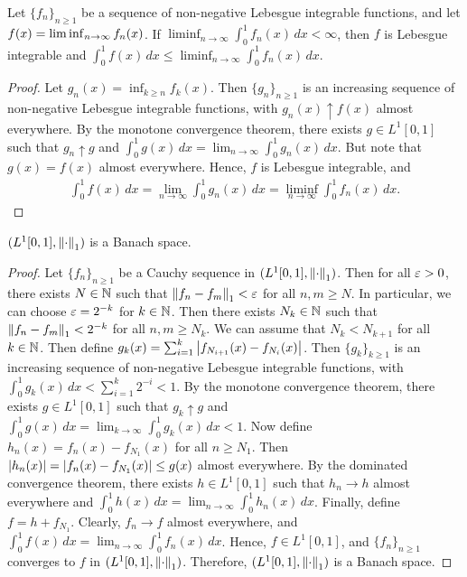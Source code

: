 \begin{lemma}
    Let $\{f_{n}\}_{n \geq 1}$ be a sequence of non-negative Lebesgue integrable functions, and let $f(x) = \liminf_{n \to \infty} f_{n}(x)$. If $\liminf_{n \to \infty} \int_{0}^{1} f_{n}(x) \, dx < \infty$, then $f$ is Lebesgue integrable and $\int_{0}^{1} f(x) \, dx \leq \liminf_{n \to \infty} \int_{0}^{1} f_{n}(x) \, dx$.
\end{lemma}
\begin{proof}
    Let $g_{n}(x) = \inf_{k \geq n} f_{k}(x)$. Then $\{g_{n}\}_{n \geq 1}$ is an increasing sequence of non-negative Lebesgue integrable functions, with $g_{n}(x) \uparrow f(x)$ almost everywhere. By the monotone convergence theorem, there exists $g \in L^{1}[0,1]$ such that $g_{n} \uparrow g$ and $\int_{0}^{1} g(x) \, dx = \lim_{n \to \infty} \int_{0}^{1} g_{n}(x) \, dx$. But note that $g(x) = f(x)$ almost everywhere. Hence, $f$ is Lebesgue integrable, and
    \begin{align}
        \int_{0}^{1} f(x) \, dx = \lim_{n \to \infty} \int_{0}^{1} g_{n}(x) \, dx = \liminf_{n \to \infty} \int_{0}^{1} f_{n}(x) \, dx.
    \end{align}
\end{proof}

\begin{theorem}
    $(L^{1}[0,1],\left\lVert\cdot\right\rVert_{1})$ is a Banach space.
\end{theorem}

\begin{proof}
    Let $\{f_{n}\}_{n \geq 1}$ be a Cauchy sequence in $(L^{1}[0,1],\left\lVert\cdot\right\rVert_{1})$. Then for all $\varepsilon > 0$, there exists $N \in \mathbb{N}$ such that $\left\lVert f_{n}-f_{m}\right\rVert_{1} < \varepsilon$ for all $n,m \geq N$. In particular, we can choose $\varepsilon = 2^{-k}$ for $k \in \mathbb{N}$. Then there exists $N_{k} \in \mathbb{N}$ such that $\left\lVert f_{n}-f_{m}\right\rVert_{1} < 2^{-k}$ for all $n,m \geq N_{k}$. We can assume that $N_{k} < N_{k+1}$ for all $k \in \mathbb{N}$. Then define $g_{k}(x) = \sum_{i=1}^{k} \left| f_{N_{i+1}}(x)-f_{N_{i}}(x) \right|$. Then $\{g_{k}\}_{k \geq 1}$ is an increasing sequence of non-negative Lebesgue integrable functions, with $\int_{0}^{1} g_{k}(x) \, dx < \sum_{i=1}^{k} 2^{-i} < 1$. By the monotone convergence theorem, there exists $g \in L^{1}[0,1]$ such that $g_{k} \uparrow g$ and $\int_{0}^{1} g(x) \, dx = \lim_{k \to \infty} \int_{0}^{1} g_{k}(x) \, dx < 1$. Now define $h_{n}(x) = f_{n}(x)-f_{N_{1}}(x)$ for all $n \geq N_{1}$. Then $\left| h_{n}(x) \right| = \left| f_{n}(x)-f_{N_{1}}(x) \right| \leq g(x)$ almost everywhere. By the dominated convergence theorem, there exists $h \in L^{1}[0,1]$ such that $h_{n} \to h$ almost everywhere and $\int_{0}^{1} h(x) \, dx = \lim_{n \to \infty} \int_{0}^{1} h_{n}(x) \, dx$. Finally, define $f = h+f_{N_{1}}$. Clearly, $f_{n} \to f$ almost everywhere, and $\int_{0}^{1} f(x) \, dx = \lim_{n \to \infty} \int_{0}^{1} f_{n}(x) \, dx$. Hence, $f \in L^{1}[0,1]$, and $\{f_{n}\}_{n \geq 1}$ converges to $f$ in $(L^{1}[0,1],\left\lVert\cdot\right\rVert_{1})$. Therefore, $(L^{1}[0,1],\left\lVert\cdot\right\rVert_{1})$ is a Banach space.
\end{proof}


